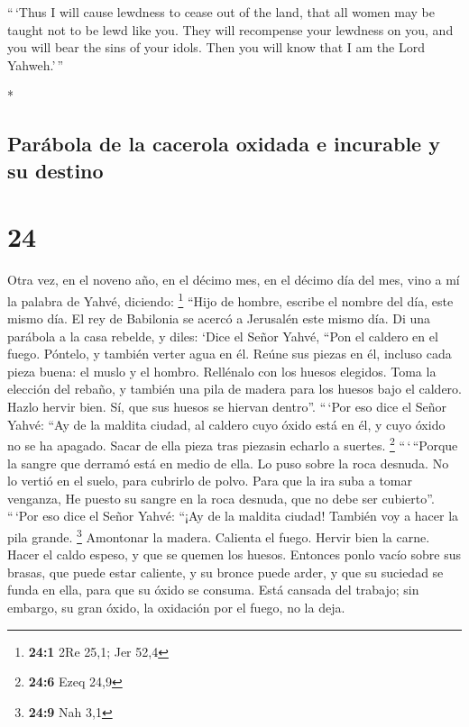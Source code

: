 \begin{paracol}{2}
\begin{otherlanguage}{english}
 ``\,`Thus I will cause lewdness to cease out of the
land, that all women may be taught not to be lewd like you.
 They will recompense your lewdness on you, and you will
bear the sins of your idols. Then you will know that I am the Lord
Yahweh.'\,''

\end{otherlanguage}

\switchcolumn[0]*

\hypertarget{paruxe1bola-de-la-cacerola-oxidada-e-incurable-y-su-destino}{%
\subsection{Parábola de la cacerola oxidada e incurable y su
destino}\label{paruxe1bola-de-la-cacerola-oxidada-e-incurable-y-su-destino}}

\hypertarget{section-46}{%
\section{24}\label{section-46}}

 Otra vez, en el noveno año, en el décimo mes, en el
décimo día del mes, vino a mí la palabra de Yahvé, diciendo: \footnote{\textbf{24:1}
  2Re 25,1; Jer 52,4}  ``Hijo de hombre, escribe el nombre
del día, este mismo día. El rey de Babilonia se acercó a Jerusalén este
mismo día.  Di una parábola a la casa rebelde, y diles:
`Dice el Señor Yahvé, ``Pon el caldero en el fuego. Póntelo, y también
verter agua en él.  Reúne sus piezas en él, incluso cada
pieza buena: el muslo y el hombro. Rellénalo con los huesos elegidos.
 Toma la elección del rebaño, y también una pila de madera
para los huesos bajo el caldero. Hazlo hervir bien. Sí, que sus huesos
se hiervan dentro''.  ``\,`Por eso dice el Señor Yahvé:
``Ay de la maldita ciudad, al caldero cuyo óxido está en él, y cuyo
óxido no se ha apagado. Sacar de ella pieza tras piezasin echarlo a
suertes. \footnote{\textbf{24:6} Ezeq 24,9} 
``\,`\,``Porque la sangre que derramó está en medio de ella. Lo puso
sobre la roca desnuda. No lo vertió en el suelo, para cubrirlo de polvo.
 Para que la ira suba a tomar venganza, He puesto su
sangre en la roca desnuda, que no debe ser cubierto''. 
``\,`Por eso dice el Señor Yahvé: ``¡Ay de la maldita ciudad! También
voy a hacer la pila grande. \footnote{\textbf{24:9} Nah 3,1}
 Amontonar la madera. Calienta el fuego. Hervir bien la
carne. Hacer el caldo espeso, y que se quemen los huesos.
 Entonces ponlo vacío sobre sus brasas, que puede estar
caliente, y su bronce puede arder, y que su suciedad se funda en ella,
para que su óxido se consuma.  Está cansada del trabajo;
sin embargo, su gran óxido, la oxidación por el fuego, no la deja.


\end{paracol}
